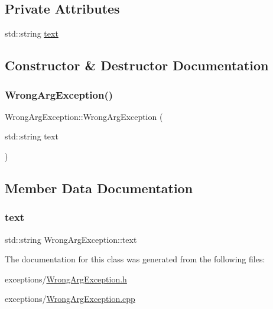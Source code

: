 \subsection*{Private Attributes}
\begin{DoxyCompactItemize}
\item 
std\+::string \hyperlink{class_wrong_arg_exception_a8ed636869cba7a41440f63795fef9ede}{text}
\end{DoxyCompactItemize}


\subsection{Constructor \& Destructor Documentation}
\mbox{\label{class_wrong_arg_exception_a9462f257043ca3fa9bace884a103b67e}} 
\subsubsection{\texorpdfstring{Wrong\+Arg\+Exception()}{WrongArgException()}}
{\footnotesize\ttfamily Wrong\+Arg\+Exception\+::\+Wrong\+Arg\+Exception (\begin{DoxyParamCaption}\item[{std\+::string}]{text }\end{DoxyParamCaption})}



\subsection{Member Data Documentation}
\mbox{\label{class_wrong_arg_exception_a8ed636869cba7a41440f63795fef9ede}} 
\subsubsection{\texorpdfstring{text}{text}}
{\footnotesize\ttfamily std\+::string Wrong\+Arg\+Exception\+::text\hspace{0.3cm}{\ttfamily [private]}}



The documentation for this class was generated from the following files\+:\begin{DoxyCompactItemize}
\item 
exceptions/\hyperlink{_wrong_arg_exception_8h}{Wrong\+Arg\+Exception.\+h}\item 
exceptions/\hyperlink{_wrong_arg_exception_8cpp}{Wrong\+Arg\+Exception.\+cpp}\end{DoxyCompactItemize}
